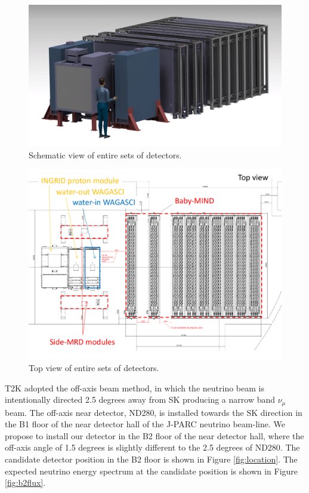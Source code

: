 \begin{figure}[tbh]
\begin{center}
\includegraphics[width=0.8\linewidth]{fig/wagasci_smrd_babymind.pdf}
\end{center}
\caption{
Schematic view of entire sets of detectors.
}
\label{fig:all_detector}
\end{figure}

\begin{figure}[tbh]
\begin{center}
\includegraphics[width=0.8\linewidth]{fig/wagasci_smrd_babymind_topview.pdf}
\end{center}
\caption{
Top view of entire sets of detectors.
}
\label{fig:all_detector_topview}
\end{figure}


T2K adopted the off-axis beam method, in which
the neutrino beam is intentionally directed 2.5 degrees away from SK producing a narrow band $\nu_{\mu}$ beam.
The off-axis near detector, ND280, is installed towards the SK direction in the B1 floor of the near detector hall of the J-PARC neutrino beam-line.
We propose to install our detector in the B2 floor of the near detector hall, 
where the off-axis angle of 1.5 degrees is slightly different to the 2.5 degrees of ND280.
The candidate detector position in the B2 floor is shown in Figure \ref{fig:location}.
The expected neutrino energy spectrum at the candidate position is shown in Figure \ref{fig:b2flux}.

